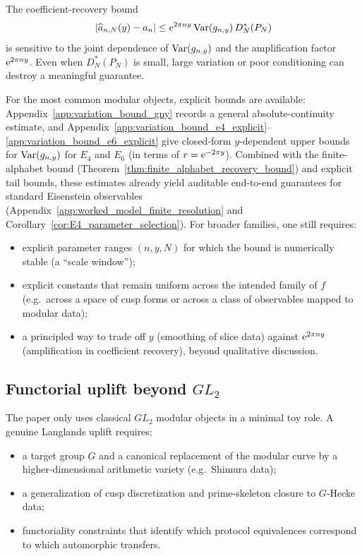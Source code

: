 The coefficient-recovery bound
\[
|\widehat a_{n,N}(y)-a_n|
\le \mathrm{e}^{2\pi n y}\,\mathrm{Var}(g_{n,y})\,D_N^\ast(P_N)
\]
is sensitive to the joint dependence of $\mathrm{Var}(g_{n,y})$ and the amplification factor $\mathrm{e}^{2\pi n y}$.
Even when $D_N^\ast(P_N)$ is small, large variation or poor conditioning can destroy a meaningful guarantee.
\par
For the most common modular objects, explicit bounds are available:
Appendix~\ref{app:variation_bound_gny} records a general absolute-continuity estimate, and Appendix~\ref{app:variation_bound_e4_explicit}--\ref{app:variation_bound_e6_explicit} give closed-form $y$-dependent upper bounds for $\mathrm{Var}(g_{n,y})$ for $E_4$ and $E_6$ (in terms of $r=\mathrm{e}^{-2\pi y}$).
Combined with the finite-alphabet bound (Theorem~\ref{thm:finite_alphabet_recovery_bound}) and explicit tail bounds, these estimates already yield auditable end-to-end guarantees for standard Eisenstein observables (Appendix~\ref{app:worked_model_finite_resolution} and Corollary~\ref{cor:E4_parameter_selection}). For broader families, one still requires:
\begin{itemize}
\item explicit parameter ranges $(n,y,N)$ for which the bound is numerically stable (a ``scale window'');
\item explicit constants that remain uniform across the intended family of $f$ (e.g.\ across a space of cusp forms or across a class of observables mapped to modular data);
\item a principled way to trade off $y$ (smoothing of slice data) against $\mathrm{e}^{2\pi n y}$ (amplification in coefficient recovery), beyond qualitative discussion.
\end{itemize}

\subsection{Functorial uplift beyond \texorpdfstring{$GL_2$}{GL2}}

The paper only uses classical $GL_2$ modular objects in a minimal toy role. A genuine Langlands uplift requires:
\begin{itemize}
\item a target group $G$ and a canonical replacement of the modular curve by a higher-dimensional arithmetic variety (e.g.\ Shimura data);
\item a generalization of cusp discretization and prime-skeleton closure to $G$-Hecke data;
\item functoriality constraints that identify which protocol equivalences correspond to which automorphic transfers.
\end{itemize}

